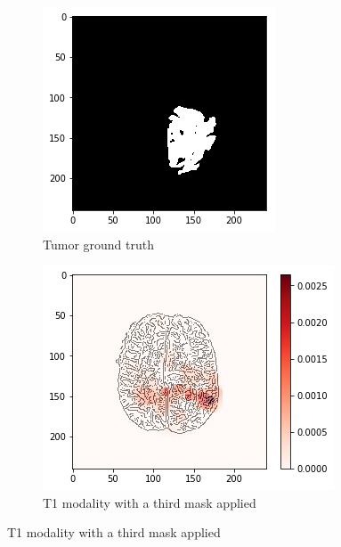 \begin{figure}[H]
\begin{subfigure}[t]{.4\textwidth}
        \includegraphics[width=\linewidth]{chapters/06_hdm/b_Brats18_TCIA08_242_1_L2/20.png}
        \caption{Tumor ground truth}
    \end{subfigure}
    \begin{subfigure}[t]{.45\textwidth}
        \centering
        \includegraphics[width=\linewidth]{chapters/06_hdm/b_Brats18_TCIA08_242_1_L2/23.png}
        \caption{T1 modality with a third mask applied}
    \end{subfigure}\hspace{1cm}%

\end{figure}
